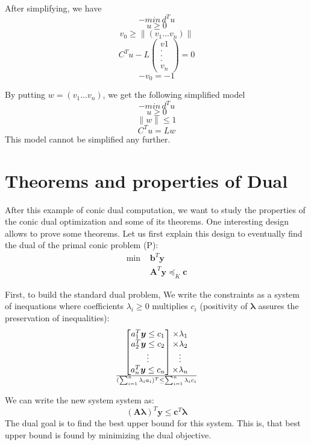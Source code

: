 \documentclass[11pt,a4paper]{article}
\begin{document}
 After simplifying, we have \\
 $$-min \, d^Tu$$
 $$u \geq 0$$
 $$v_0 \geq \parallel (v_1 ... v_n) \parallel$$
 $$C^Tu - L\begin{pmatrix}
 v1\\ 
 .\\
 .\\
 .\\
 v_n
 \end{pmatrix} = 0 $$
 $$-v_0=-1$$
 
 By putting $w=(v_1 ... v_n)$, we get the following simplified model 
$$-min \, d^Tu$$
$$u \geq 0$$
$$\parallel w \parallel \leq 1$$
$$C^Tu = Lw$$
This model cannot be simplified any further. 




\section{Theorems and properties of Dual}
After this example of conic dual computation, we want to study the properties of the conic dual optimization and some of its theorems. One interesting design allows to prove some theorems. Let us first explain this design to eventually find the dual of the primal conic problem (P):
\begin{align*}
\textrm{min }&\textbf{b}^T\textbf{y}\\
             &\textbf{A}^T\textbf{y}\preceq_K \textbf{c}
\end{align*}

First, to build the standard dual problem, We write the constraints as a system of inequations where coefficients $\lambda_i \geq 0$ multiplies $c_i$ (positivity of $\boldsymbol{\lambda}$ assures the preservation of inequalities):
\[\begin{bmatrix}
 a_1^T \boldsymbol{y} \leq c_1\\
 a_2^T \boldsymbol{y} \leq c_2\\
 \vdots\\
 a_n^T \boldsymbol{y} \leq c_n
\end{bmatrix}
\begin{matrix}
 \times \lambda_1\\
 \times \lambda_2\\
 \vdots\\
 \times \lambda_n
\end{matrix}
\over
(\sum_{i=1}^{n}\lambda_i a_i)^T \leq \sum_{i=1}^{n}\lambda_i c_i\]

We can write the new system system as:
\[(\boldsymbol{A}\boldsymbol{\lambda})^T \boldsymbol{y} \leq \boldsymbol{c}^T \boldsymbol{\lambda}
\]
The dual goal is to find the best upper bound for this system. This is, that best upper bound is found by minimizing the dual objective.\\
\end{document}
